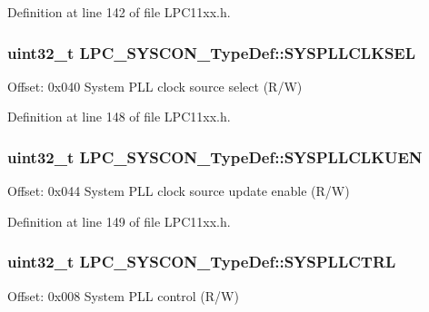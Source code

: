 Definition at line 142 of file L\+P\+C11xx.\+h.

\subsubsection[{\texorpdfstring{S\+Y\+S\+P\+L\+L\+C\+L\+K\+S\+EL}{SYSPLLCLKSEL}}]{ uint32\+\_\+t L\+P\+C\+\_\+\+S\+Y\+S\+C\+O\+N\+\_\+\+Type\+Def\+::\+S\+Y\+S\+P\+L\+L\+C\+L\+K\+S\+EL}\hypertarget{group___l_p_c11xx___definitions_ga51f62077336072e5861eaf1fccebfa25}{}\label{group___l_p_c11xx___definitions_ga51f62077336072e5861eaf1fccebfa25}
Offset\+: 0x040 System P\+LL clock source select (R/W) 

Definition at line 148 of file L\+P\+C11xx.\+h.

\subsubsection[{\texorpdfstring{S\+Y\+S\+P\+L\+L\+C\+L\+K\+U\+EN}{SYSPLLCLKUEN}}]{ uint32\+\_\+t L\+P\+C\+\_\+\+S\+Y\+S\+C\+O\+N\+\_\+\+Type\+Def\+::\+S\+Y\+S\+P\+L\+L\+C\+L\+K\+U\+EN}\hypertarget{group___l_p_c11xx___definitions_gae66518ea53c8ee53935f6a073262dab7}{}\label{group___l_p_c11xx___definitions_gae66518ea53c8ee53935f6a073262dab7}
Offset\+: 0x044 System P\+LL clock source update enable (R/W) 

Definition at line 149 of file L\+P\+C11xx.\+h.

\subsubsection[{\texorpdfstring{S\+Y\+S\+P\+L\+L\+C\+T\+RL}{SYSPLLCTRL}}]{ uint32\+\_\+t L\+P\+C\+\_\+\+S\+Y\+S\+C\+O\+N\+\_\+\+Type\+Def\+::\+S\+Y\+S\+P\+L\+L\+C\+T\+RL}\hypertarget{group___l_p_c11xx___definitions_ga7c74ae51f98b5315c25dd045ce363f55}{}\label{group___l_p_c11xx___definitions_ga7c74ae51f98b5315c25dd045ce363f55}
Offset\+: 0x008 System P\+LL control (R/W) 

